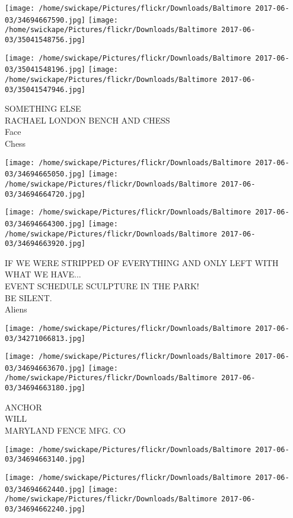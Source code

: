 \documentclass[10pt,letterpaper]{article}
\begin{document}
\texttt{[image: /home/swickape/Pictures/flickr/Downloads/Baltimore 2017-06-03/34694667590.jpg]}
\texttt{[image: /home/swickape/Pictures/flickr/Downloads/Baltimore 2017-06-03/35041548756.jpg]}

\texttt{[image: /home/swickape/Pictures/flickr/Downloads/Baltimore 2017-06-03/35041548196.jpg]}
\texttt{[image: /home/swickape/Pictures/flickr/Downloads/Baltimore 2017-06-03/35041547946.jpg]}

SOMETHING ELSE\\
RACHAEL LONDON BENCH AND CHESS\\
Face\\
Chess
\pagebreak

\texttt{[image: /home/swickape/Pictures/flickr/Downloads/Baltimore 2017-06-03/34694665050.jpg]}
\texttt{[image: /home/swickape/Pictures/flickr/Downloads/Baltimore 2017-06-03/34694664720.jpg]}

\texttt{[image: /home/swickape/Pictures/flickr/Downloads/Baltimore 2017-06-03/34694664300.jpg]}
\texttt{[image: /home/swickape/Pictures/flickr/Downloads/Baltimore 2017-06-03/34694663920.jpg]}

IF WE WERE STRIPPED OF EVERYTHING AND ONLY LEFT WITH WHAT WE HAVE...\\
EVENT SCHEDULE SCULPTURE IN THE PARK!\\
BE SILENT.\\
Aliens
\pagebreak

\texttt{[image: /home/swickape/Pictures/flickr/Downloads/Baltimore 2017-06-03/34271066813.jpg]}

\vspace{0.25in}
\texttt{[image: /home/swickape/Pictures/flickr/Downloads/Baltimore 2017-06-03/34694663670.jpg]}
\texttt{[image: /home/swickape/Pictures/flickr/Downloads/Baltimore 2017-06-03/34694663180.jpg]}

ANCHOR\\
WILL\\
MARYLAND FENCE MFG. CO
\pagebreak

\texttt{[image: /home/swickape/Pictures/flickr/Downloads/Baltimore 2017-06-03/34694663140.jpg]}

\vspace{0.25in}
\texttt{[image: /home/swickape/Pictures/flickr/Downloads/Baltimore 2017-06-03/34694662440.jpg]}
\texttt{[image: /home/swickape/Pictures/flickr/Downloads/Baltimore 2017-06-03/34694662240.jpg]}
\end{document}
